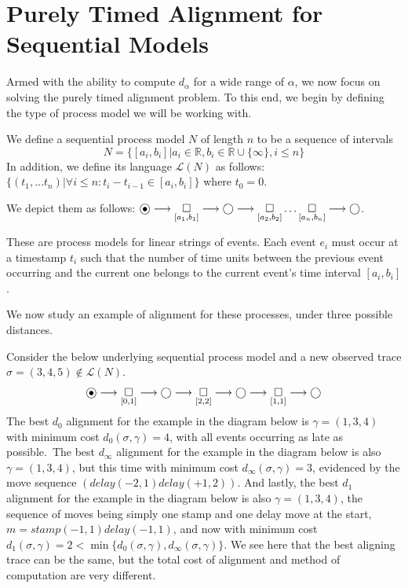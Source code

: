 \documentclass[runningheads]{llncs}
\newcommand\eye{\ensurestackMath{\stackinset{c}{}{c}{-.33pt}%
        {\bullet}{\bigcirc}}}
\begin{document}
\section{Purely Timed Alignment for Sequential Models}\label{4}

\color{firstrevision}
Armed with the ability to compute $d_\alpha$ for a wide range of $\alpha$, we now focus on solving the purely timed alignment problem. 
To this end, we begin by defining the type of process model we will be working with.\color{black}

\begin{definition}
We define a sequential process model $N$ of length $n$ to be a sequence of intervals $$N = \{[a_i, b_i] | a_i \in \mathbb{R}, b_i \in \mathbb{R} \cup \{\infty\}, i \leq n\}$$
In addition, we define its language $\mathcal{L}(N)$ as follows: $\{(t_1, \dots t_n) | \forall i \leq n: t_i - t_{i-1} \in [a_i, b_i]\}$ where $t_0 = 0$. 

We depict them as follows: $\eye \longrightarrow \underset{[a_1, b_1]}{\square} \longrightarrow \bigcirc \longrightarrow \underset{[a_2,b_2]}{\square}  \dots  \underset{[a_n, b_n]}{\square} \longrightarrow \bigcirc$. 
\end{definition}

\color{firstrevision}
These are process models for linear strings of events. Each event $e_i$ must occur at a timestamp $t_i$ such that the number of time units between the previous event occurring and the current one belongs to the current event's time interval $[a_i, b_i]$. 

We now study an example of alignment for these processes, under three possible distances. 
\color{black}
    
\begin{example}\label{mixedmoveex}
Consider the below underlying sequential process model and a new observed trace $\sigma = (3, 4, 5) \not \in \mathcal{L}(N)$. 
$$\eye \longrightarrow \underset{[0,1]}{\square} \longrightarrow \bigcirc \longrightarrow \underset{[2,2]}{\square} \longrightarrow \bigcirc \longrightarrow \underset{[1,1]}{\square} \longrightarrow \bigcirc$$
The best $d_0$ alignment for the example in the diagram below is $\gamma = (1,3,4)$ with minimum cost $d_0(\sigma, \gamma) = 4$, \color{firstrevision}with all events occurring as late as possible.\color{black}\
The best $d_{\infty}$ alignment for the example in the diagram below is also $\gamma = (1,3,4)$, but this time with minimum cost $d_{\infty}(\sigma, \gamma) = 3$, evidenced by the move sequence $(delay(-2, 1)delay(+1, 2))$. 
And lastly, the best $d_1$ alignment for the example in the diagram below is also $\gamma = (1,3,4)$, the sequence of moves being simply one stamp and one delay move at the start, $m = stamp(-1, 1)delay(-1, 1)$, and now with minimum cost $d_1(\sigma, \gamma) = 2 < \min \{d_0(\sigma, \gamma), d_\infty(\sigma, \gamma)\}$. 
\color{firstrevision}We see here that the best aligning trace can be the same, but the total cost of alignment and method of computation are very different.\color{black}
\end{example}
\end{document}
